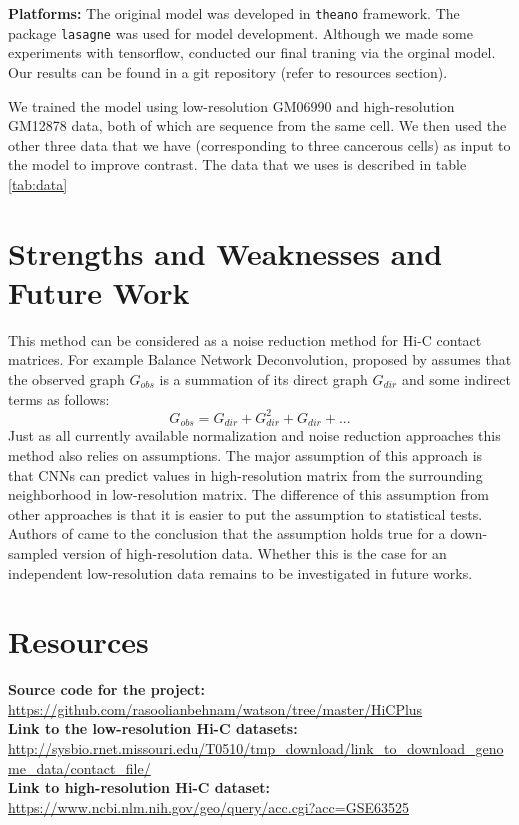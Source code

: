 \documentclass{article}
\begin{document}
\textbf{Platforms:}
The original model was developed in \texttt{theano} 
framework.
The package \texttt{lasagne} was used 
for model development. Although we made some experiments
with tensorflow, conducted our final traning via the
orginal model.
Our results can be found in a git repository (refer to
resources section).

We trained the model using low-resolution 
 GM06990 and high-resolution
 GM12878 data, both of which are sequence from
 the same cell. We then used the other three
 data that we have (corresponding to three
 cancerous cells) as input to the model to 
 improve contrast.
The data that we uses is described in table
\ref{tab:data}
\section{Strengths and Weaknesses and Future Work}
This method can be considered as a noise reduction method
for Hi-C contact matrices. 
For example Balance Network Deconvolution,
proposed by \cite{feizi2013network}
assumes that the observed graph $G_{obs}$ is a summation of its
direct graph $G_{dir}$ and some indirect terms as follows:
\begin{equation}
        \label{indirect_effects}
            G_{obs} = G_{dir} + G_{dir}^2 + G_{dir} + ...
\end{equation}
Just as all currently available
normalization and noise reduction approaches this method
also relies on assumptions. The major assumption of this
approach is that CNNs can predict values in high-resolution
matrix from the surrounding neighborhood in low-resolution
matrix. The difference of this assumption from other 
approaches is that it is easier to put the assumption to
statistical tests. Authors of \cite{zhang2018enhancing}
came to the conclusion that the assumption holds true for
a down-sampled version of high-resolution data. Whether
this is the case for an independent low-resolution data
remains to be investigated in future works.
\section{Resources}
\textbf{Source code for the project:}\\
\url{https://github.com/rasoolianbehnam/watson/tree/master/HiCPlus}\\
\textbf{Link to the low-resolution Hi-C datasets:}\\
\url{http://sysbio.rnet.missouri.edu/T0510/tmp_download/link_to_download_genome_data/contact_file/}\\
\textbf{Link to high-resolution Hi-C dataset:}\\
\url{https://www.ncbi.nlm.nih.gov/geo/query/acc.cgi?acc=GSE63525}





\begin{acronym}
\end{acronym}
\end{document}
